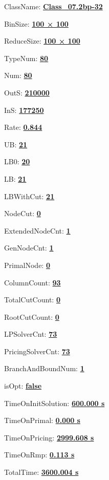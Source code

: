 \documentclass[11pt]{article}
\begin{document}
\pagestyle{empty}


ClassName: \underline{\textbf{Class_07.2bp-32}}
\par
BinSize: \underline{\textbf{100 × 100}}
\par
ReduceSize: \underline{\textbf{100 × 100}}
\par
TypeNum: \underline{\textbf{80}}
\par
Num: \underline{\textbf{80}}
\par
OutS: \underline{\textbf{210000}}
\par
InS: \underline{\textbf{177250}}
\par
Rate: \underline{\textbf{0.844}}
\par
UB: \underline{\textbf{21}}
\par
LB0: \underline{\textbf{20}}
\par
LB: \underline{\textbf{21}}
\par
LBWithCut: \underline{\textbf{21}}
\par
NodeCut: \underline{\textbf{0}}
\par
ExtendedNodeCnt: \underline{\textbf{1}}
\par
GenNodeCnt: \underline{\textbf{1}}
\par
PrimalNode: \underline{\textbf{0}}
\par
ColumnCount: \underline{\textbf{93}}
\par
TotalCutCount: \underline{\textbf{0}}
\par
RootCutCount: \underline{\textbf{0}}
\par
LPSolverCnt: \underline{\textbf{73}}
\par
PricingSolverCnt: \underline{\textbf{73}}
\par
BranchAndBoundNum: \underline{\textbf{1}}
\par
isOpt: \underline{\textbf{false}}
\par
TimeOnInitSolution: \underline{\textbf{600.000 s}}
\par
TimeOnPrimal: \underline{\textbf{0.000 s}}
\par
TimeOnPricing: \underline{\textbf{2999.608 s}}
\par
TimeOnRmp: \underline{\textbf{0.113 s}}
\par
TotalTime: \underline{\textbf{3600.004 s}}
\par
\newpage


\end{document}
